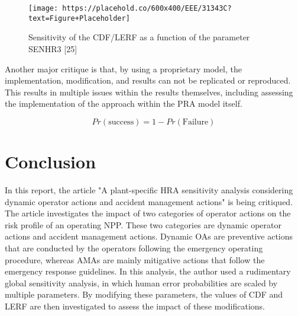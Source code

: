 \documentclass[11pt, letterpaper]{article}
\begin{document}
\begin{figure}[h!]
    \centering
    \texttt{[image: https://placehold.co/600x400/EEE/31343C?text=Figure+Placeholder]}
    \caption{Sensitivity of the CDF/LERF as a function of the parameter SENHR3 [25]}
    \label{fig:sensitivity}
\end{figure}

Another major critique is that, by using a proprietary model, the implementation, modification, and results can not be replicated or reproduced. This results in multiple issues within the results themselves, including assessing the implementation of the approach within the PRA model itself.

\begin{equation}
Pr(\text{success})=1-Pr(\text{Failure})
\end{equation}

\section{Conclusion}
In this report, the article "A plant-specific HRA sensitivity analysis considering dynamic operator actions and accident management actions" is being critiqued. The article investigates the impact of two categories of operator actions on the risk profile of an operating NPP. These two categories are dynamic operator actions and accident management actions. Dynamic OAs are preventive actions that are conducted by the operators following the emergency operating procedure, whereas AMAs are mainly mitigative actions that follow the emergency response guidelines. In this analysis, the author used a rudimentary global sensitivity analysis, in which human error probabilities are scaled by multiple parameters. By modifying these parameters, the values of CDF and LERF are then investigated to assess the impact of these modifications.
\end{document}
